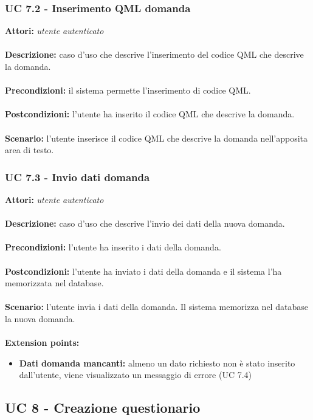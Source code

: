 \documentclass[a4paper,11pt]{article}
\begin{document}
\subsubsection{UC 7.2 - Inserimento QML domanda}

\textbf{Attori:} \textit{utente autenticato}
\\ \\
\textbf{Descrizione:} caso d'uso che descrive l'inserimento del codice QML che descrive la domanda.\\
\\
\textbf{Precondizioni:} il sistema permette l'inserimento di codice QML.\\
\\
\textbf{Postcondizioni:} l’utente ha inserito il codice QML che descrive la domanda.\\
\\
\textbf{Scenario:} l’utente inserisce il codice QML che descrive la domanda nell'apposita area di testo.\\


\subsubsection{UC 7.3 - Invio dati domanda}

\textbf{Attori:} \textit{utente autenticato}
\\ \\
\textbf{Descrizione:} caso d'uso che descrive l'invio dei dati della nuova domanda.\\
\\
\textbf{Precondizioni:} l'utente ha inserito i dati della domanda.\\
\\
\textbf{Postcondizioni:} l’utente ha inviato i dati della domanda e il sistema l'ha memorizzata nel database.\\
\\
\textbf{Scenario:} l’utente invia i dati della domanda. Il sistema memorizza nel database la nuova domanda.\\
\\
\textbf{Extension points:} 
\begin{itemize}
	\item \textbf{Dati domanda mancanti:} almeno un dato richiesto non è stato inserito dall'utente, viene visualizzato un messaggio di errore (UC 7.4)
\end{itemize}


\newpage
\subsection{UC 8 - Creazione questionario}
\end{document}
